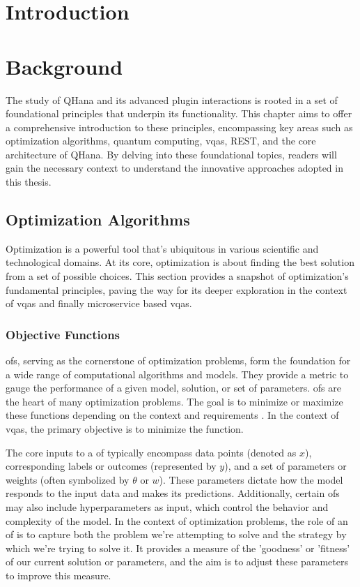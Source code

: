\documentclass[
  a4paper,  %
  twoside,  %
  bibliography=totoc,
  headsepline,
  cleardoublepage=empty,
  parskip=half,
  draft=false
]{scrbook}
\begin{document}
\chapter{Introduction}
\label{chap:introduction}

\chapter{Background}
\label{chap:background}

The study of QHana and its advanced plugin interactions is rooted in a set of foundational principles that underpin its functionality.
This chapter aims to offer a comprehensive introduction to these principles, encompassing key areas such as optimization algorithms, quantum computing, \glspl{vqa}, REST, and the core architecture of QHana.
By delving into these foundational topics, readers will gain the necessary context to understand the innovative approaches adopted in this thesis.

\section{Optimization Algorithms}
\label{sec:optimizationAlgorithms}
Optimization is a powerful tool that's ubiquitous in various scientific and technological domains.
At its core, optimization is about finding the best solution from a set of possible choices.
This section provides a snapshot of optimization's fundamental principles, paving the way for its deeper exploration in the context of \glspl{vqa} and finally microservice based \glspl{vqa}.

\subsection{Objective Functions}
\label{subsec:objectiveFunctions}
\glspl{of}, serving as the cornerstone of optimization problems, form the foundation for a wide range of computational algorithms and models.
They provide a metric to gauge the performance of a given model, solution, or set of parameters.
\glspl{of} are the heart of many optimization problems.
The goal is to minimize or maximize these functions depending on the context and requirements \cite{Weinan2017}.
In the context of \glspl{vqa}, the primary objective is to minimize the function.

The core inputs to a \gls{of} typically encompass data points (denoted as $x$), corresponding labels or outcomes (represented by $y$), and a set of parameters or weights (often symbolized by $\theta$ or $w$).
These parameters dictate how the model responds to the input data and makes its predictions.
Additionally, certain \glspl{of} may also include hyperparameters as input, which control the behavior and complexity of the model.
In the context of optimization problems, the role of an \gls{of} is to capture both the problem we're attempting to solve and the strategy by which we're trying to solve it.
It provides a measure of the 'goodness' or 'fitness' of our current solution or parameters, and the aim is to adjust these parameters to improve this measure.
\end{document}

